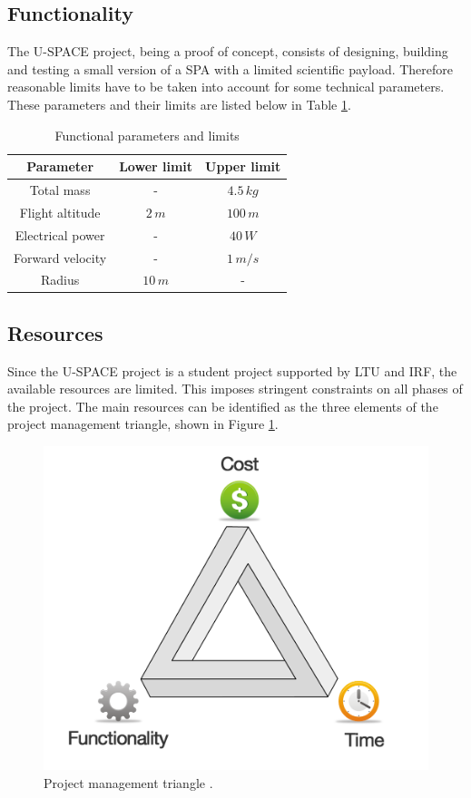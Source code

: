 \subsection{Functionality}
%
The \ac{U-SPACE} project, being a proof of concept, consists of designing, building and testing a small version of a \ac{SPA} with a limited scientific payload. Therefore reasonable limits have to be taken into account for some technical parameters. These parameters and their limits are listed below in Table \ref{tab:functionality}.
%
\begin{table}[H]
\centering
\caption{Functional parameters and limits}
\label{tab:functionality}
\begin{tabular}{c c c}
\hline
\textbf{Parameter} & \textbf{Lower limit} & \textbf{Upper limit}\\ \hline
Total mass & - & $4.5\,kg$\\
Flight altitude & $2\,m$ & $100\,m$\\
Electrical power & - & $40\,W$\\
Forward velocity & - & $1\,m/s$\\
Radius & $10\,m$ & -\\
\hline
\end{tabular}
\vspace{-1.0em}
\end{table}
%
\subsection{Resources}
%
Since the \ac{U-SPACE} project is a student project supported by \ac{LTU} and \ac{IRF}, the available resources are limited. This imposes stringent constraints on all phases of the project. The main resources can be identified as the three elements of the project management triangle, shown in Figure \ref{fig:project_triangle}.
%
\begin{figure}[h!]
\centering
\includegraphics[scale=0.2]{figures/project_triangle.png}
\caption[Project management triangle]{Project management triangle \cite{website:claromentis}.}
\label{fig:project_triangle}
\vspace{-0.5em}
\end{figure}
%

